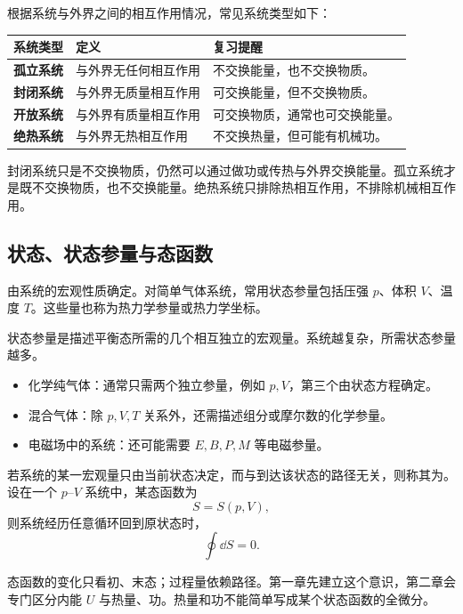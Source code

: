 根据系统与外界之间的相互作用情况，常见系统类型如下：

\begin{FormulaBox}[系统分类]
\begin{tabularx}{\textwidth}{@{}>{\bfseries}lXX@{}}
系统类型 & 定义 & 复习提醒\\
\midrule
孤立系统 & 与外界无任何相互作用 & 不交换能量，也不交换物质。\\
封闭系统 & 与外界无质量相互作用 & 可交换能量，但不交换物质。\\
开放系统 & 与外界有质量相互作用 & 可交换物质，通常也可交换能量。\\
绝热系统 & 与外界无热相互作用 & 不交换热量，但可能有机械功。\\
\end{tabularx}
\end{FormulaBox}

\begin{WarnBox}
封闭系统只是不交换物质，仍然可以通过做功或传热与外界交换能量。孤立系统才是既不交换物质，也不交换能量。绝热系统只排除热相互作用，不排除机械相互作用。
\end{WarnBox}

\subsection{状态、状态参量与态函数}

由系统的宏观性质确定。对简单气体系统，常用状态参量包括压强 \(p\)、体积 \(V\)、温度 \(T\)。这些量也称为热力学参量或热力学坐标。

\begin{KeyBox}[状态参量的独立性]
状态参量是描述平衡态所需的几个相互独立的宏观量。系统越复杂，所需状态参量越多。
\begin{itemize}
  \item 化学纯气体：通常只需两个独立参量，例如 \(p,V\)，第三个由状态方程确定。
  \item 混合气体：除 \(p,V,T\) 关系外，还需描述组分或摩尔数的化学参量。
  \item 电磁场中的系统：还可能需要 \(E,B,P,M\) 等电磁参量。
\end{itemize}
\end{KeyBox}

若系统的某一宏观量只由当前状态决定，而与到达该状态的路径无关，则称其为。设在一个 \(p\)--\(V\) 系统中，某态函数为
\[
  S=S(p,V),
\]
则系统经历任意循环回到原状态时，
\[
  \oint \dd S=0.
\]

\begin{WarnBox}
态函数的变化只看初、末态；过程量依赖路径。第一章先建立这个意识，第二章会专门区分内能 \(U\) 与热量、功。热量和功不能简单写成某个状态函数的全微分。
\end{WarnBox}

